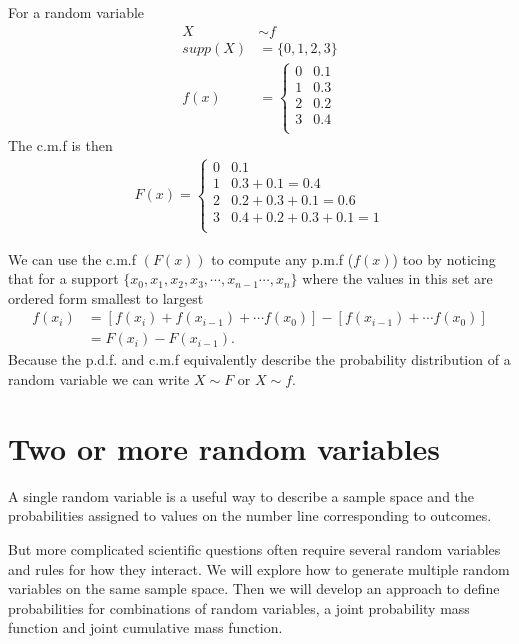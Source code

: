 \ex For a random variable 
\begin{align}
    X &\sim f\\
    supp(X) &= \{0,1,2,3\}\\
    f(x) &= \begin{cases}
     0 & 0.1\\
     1 & 0.3\\
     2 & 0.2\\
     3 & 0.4\\
    \end{cases}
\end{align}
The c.m.f is then 
\begin{align}
    F(x) =  
    \begin{cases}
     0 & 0.1\\
     1 & 0.3 + 0.1 = 0.4\\
     2 & 0.2+0.3+0.1 = 0.6\\
     3 & 0.4+0.2+0.3+0.1 = 1\\
     \end{cases}
\end{align}

We can use the c.m.f $(F(x))$ to compute any p.m.f ($f(x)$) too by noticing that for a support $\{x_{0},x_{1},x_{2},x_{3}, \cdots,x_{n-1}\cdots,x_{n}\}$ where the values in this set are ordered form smallest to largest 
\begin{align}
    f(x_{i}) &= \left[f(x_{i}) + f(x_{i-1}) + \cdots f(x_{0}) \right] - \left[f(x_{i-1}) + \cdots f(x_{0})\right] \\ 
    &=F(x_{i}) - F(x_{i-1}).
\end{align}
Because the p.d.f. and c.m.f equivalently describe the probability distribution of a random variable we can write $X\sim F$ or $X \sim f$.  

\section{Two or more random variables}

A single random variable is a useful way to describe a sample space and the probabilities assigned to values on the number line corresponding to outcomes.

But more complicated scientific questions often require several random variables and rules for how they interact.
We will explore how to generate multiple random variables  on the same sample space. 
Then we will develop an approach to define probabilities for combinations of random variables, a joint probability mass function and joint cumulative mass function.

